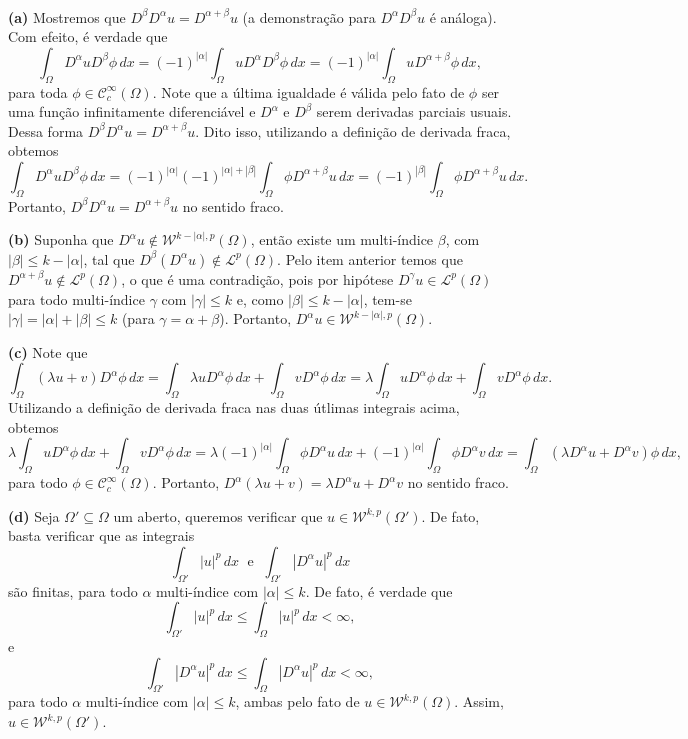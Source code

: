 \documentclass[a4paper, 11pt]{book}
\theoremstyle{definition}
\newcommand{\cC}{\mathcal{C}}
\newcommand{\cL}{\mathcal{L}}
\newcommand{\cW}{\mathcal{W}}
\begin{document}
\begin{prf}
    ~

    \textbf{(a)} Mostremos que $D^{\beta}D^{\alpha} u = D^{\alpha + \beta}u$ (a demonstração para $D^{\alpha}D^{\beta} u$ é análoga).
    Com efeito, é verdade que
    \[
        \int_\Omega D^{\alpha} u D^{\beta} \phi \, dx = (-1)^{|\alpha|} \int_\Omega u D^{\alpha} D^{\beta} \phi \, dx = (-1)^{|\alpha|} \int_\Omega u D^{\alpha + \beta} \phi \,dx,
    \]
    para toda $\phi \in \cC^{\infty}_c(\Omega)$. Note que a última igualdade é válida pelo fato de $\phi$ ser uma função infinitamente diferenciável e $D^\alpha$ e $D^\beta$ serem derivadas parciais usuais.
    Dessa forma $D^{\beta}D^{\alpha} u = D^{\alpha + \beta} u$.
    Dito isso, utilizando a definição de derivada fraca, obtemos
    \[
        \int_\Omega D^{\alpha} u D^{\beta} \phi \, dx = (-1)^{|\alpha|}(-1)^{|\alpha| + |\beta|} \int_\Omega \phi D^{\alpha+\beta} u \,dx = (-1)^{|\beta|} \int_\Omega \phi D^{\alpha + \beta} u \,dx.
    \]
    Portanto, $D^{\beta} D^{\alpha} u = D^{\alpha + \beta} u$ no sentido fraco.

    \textbf{(b)} Suponha que $D^\alpha u \not\in \cW^{k-|\alpha|,p}(\Omega)$, então existe um multi-índice $\beta$, com $|\beta| \leqslant k - |\alpha|$, tal que $D^{\beta}(D^{\alpha}u) \not\in \cL^p(\Omega)$.
    Pelo item anterior temos que $D^{\alpha+\beta}u \not\in \cL^p(\Omega)$, o que é uma contradição, pois por hipótese $D^{\gamma}u \in \cL^p(\Omega)$ para todo multi-índice $\gamma$ com $|\gamma| \leqslant k$ e, como $|\beta| \leqslant k - |\alpha|$, tem-se $|\gamma| = |\alpha| + |\beta| \leqslant k$ (para $\gamma = \alpha + \beta$).
    Portanto, $D^{\alpha}u \in \cW^{k-|\alpha|,p}(\Omega)$.

    \textbf{(c)} Note que
    \[
        \int_\Omega (\lambda u + v) D^{\alpha}\phi \,dx = \int_\Omega \lambda u D^\alpha \phi \, dx + \int_\Omega v D^\alpha \phi \, dx = \lambda \int_\Omega u D^{\alpha} \phi \,dx + \int_\Omega v D^{\alpha} \phi \, dx.
    \]
    Utilizando a definição de derivada fraca nas duas útlimas integrais acima, obtemos
    {\small
    \[
        \lambda \int_\Omega u D^{\alpha} \phi \,dx + \int_\Omega v D^{\alpha} \phi \, dx = \lambda (-1)^{|\alpha|} \int_\Omega \phi D^{\alpha} u \, dx + (-1)^{|\alpha|}\int_\Omega \phi D^{\alpha} v \, dx = \int_\Omega (\lambda D^{\alpha}u + D^{\alpha}v )\phi \,dx,
    \]}\!
    para todo $\phi \in \cC^{\infty}_c(\Omega)$. Portanto, $D^{\alpha}(\lambda u + v) = \lambda D^\alpha u + D^\alpha v$ no sentido fraco.

    \textbf{(d)} Seja $\Omega' \subseteq \Omega$ um aberto, queremos verificar que $u \in \cW^{k,p}(\Omega')$.
    De fato, basta verificar que as integrais
    \[
        \int_{\Omega'} |u|^p \, dx \;\text{ e }\; \int_{\Omega'} |D^{\alpha}u|^p \, dx
    \]
    são finitas, para todo $\alpha$ multi-índice com $|\alpha| \leqslant k$. De fato, é verdade que
    \[
        \int_{\Omega'} |u|^p \, dx \leqslant \int_{\Omega} |u|^p \,dx < \infty,
    \]
    e
    \[
        \int_{\Omega'} |D^\alpha u|^p \, dx \leqslant \int_{\Omega} |D^\alpha u|^p \,dx < \infty,
    \]
    para todo $\alpha$ multi-índice com $|\alpha| \leqslant k$, ambas pelo fato de $u \in \cW^{k,p}(\Omega)$.
    Assim, $u \in \cW^{k,p}(\Omega')$.


\end{prf}
\end{document}
